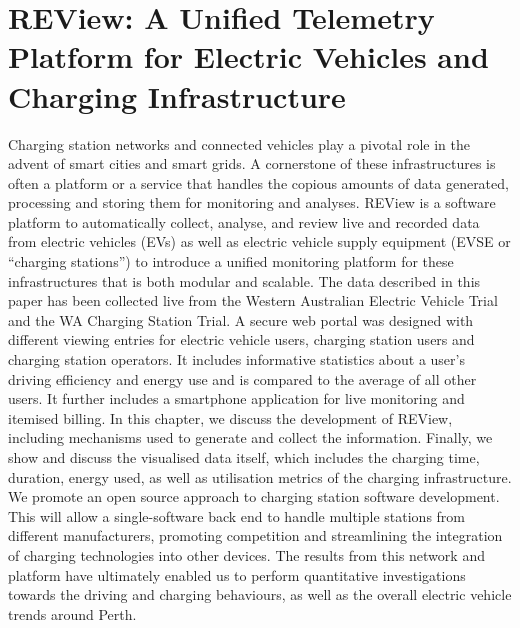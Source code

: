 
\chapter[REView]{REView: A Unified Telemetry Platform for Electric Vehicles and Charging Infrastructure}
\label{ch:review}

\ifpdf
	\graphicspath{{Chapter9/Figs/Raster/}{Chapter9/Figs/PDF/}{Chapter9/Figs/}}
\else
	\graphicspath{{Chapter9/Figs/Vector/}{Chapter9/Figs/}}
\fi

Charging station networks and connected vehicles play a pivotal role in the advent of smart cities and smart grids. A cornerstone of these infrastructures is often a platform or a service that handles the copious amounts of data generated, processing and storing them for monitoring and analyses. REView is a software platform to automatically collect, analyse, and review live and recorded data from electric vehicles (EVs) as well as electric vehicle supply equipment (EVSE or “charging stations”) to introduce a unified monitoring platform for these infrastructures that is both modular and scalable. The data described in this paper has been collected live from the Western Australian Electric Vehicle Trial and the WA Charging Station Trial. A secure web portal was designed with different viewing entries for electric vehicle users, charging station users and charging station operators. It includes informative statistics about a user’s driving efficiency and energy use and is compared to the average of all other users. It further includes a smartphone application for live monitoring and itemised billing. In this chapter, we discuss the development of REView, including mechanisms used to generate and collect the information. Finally, we show and discuss the visualised data itself, which includes the charging time, duration, energy used, as well as utilisation metrics of the charging infrastructure. We promote an open source approach to charging station software development. This will allow a single-software back end to handle multiple stations from different manufacturers, promoting competition and streamlining the integration of charging technologies into other devices. The results from this network and platform have ultimately enabled us to perform quantitative investigations towards the driving and charging behaviours, as well as the overall electric vehicle trends around Perth.


